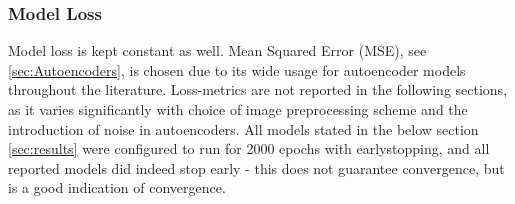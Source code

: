 \subsubsection{Model Loss}
Model loss is kept constant as well. Mean Squared Error (MSE), see \autoref{sec:Autoencoders}, is chosen due to its wide usage for autoencoder models throughout the literature.
Loss-metrics are not reported in the following sections, as it varies significantly with choice of image preprocessing scheme and the introduction of noise in autoencoders.
All models stated in the below section \autoref{sec:results} were configured to run for 2000 epochs with earlystopping, and all reported models did indeed stop early - this does not guarantee convergence, but is a good indication of convergence.
